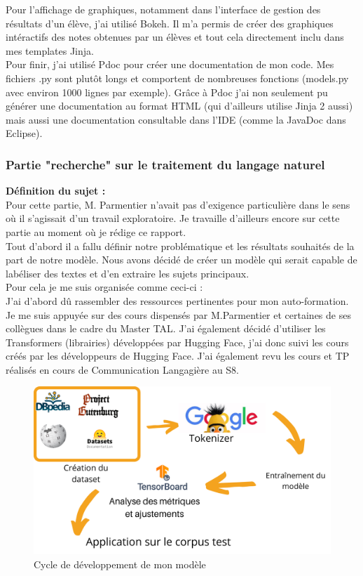 \documentclass[12pt]{article}
\begin{document}
Pour l'affichage de graphiques, notamment dans l'interface de gestion des résultats d'un élève, j'ai utilisé Bokeh. Il m'a permis de créer des graphiques intéractifs des notes obtenues par un élèves et tout cela directement inclu dans mes templates Jinja. \\

Pour finir, j'ai utilisé Pdoc pour créer une documentation de mon code. Mes fichiers .py sont plutôt longs et comportent de nombreuses fonctions (models.py avec environ 1000 lignes par exemple). Grâce à Pdoc j'ai non seulement pu générer une documentation au format HTML (qui d'ailleurs utilise Jinja 2 aussi) mais aussi une documentation consultable dans l'IDE (comme la JavaDoc dans Eclipse).


\subsubsection{Partie "recherche" sur le traitement du langage naturel}
\textbf{Définition du sujet :} \\
Pour cette partie, M. Parmentier n'avait pas d'exigence particulière dans le sens où il s'agissait d'un travail exploratoire. Je travaille d'ailleurs encore sur cette partie au moment où je rédige ce rapport. \\
Tout d'abord il a fallu définir notre problématique et les résultats souhaités de la part de notre modèle. Nous avons décidé de créer un modèle qui serait capable de labéliser des textes et d'en extraire les sujets principaux. \\

Pour cela je me suis organisée comme ceci-ci : \\
J'ai d'abord dû rassembler des ressources pertinentes pour mon auto-formation. Je me suis appuyée sur des cours dispensés par M.Parmentier et certaines de ses collègues dans le cadre du Master TAL. J'ai également décidé d'utiliser les Transformers (librairies) développées par Hugging Face, j'ai donc suivi les cours créés par les développeurs de Hugging Face. J'ai également revu les cours et TP réalisés en cours de Communication Langagière au S8. \\


\begin{figure}[h]
    \centering
    \includegraphics[scale=0.3]{graphe NLP.png}
    \caption{Cycle de développement de mon modèle}
    \label{fig:NLP}
\end{figure}
\end{document}
